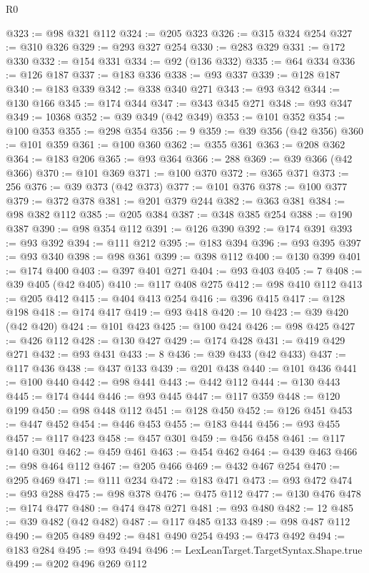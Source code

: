 \begin{lexlean}{R0}
\begin{coremodule}
@323 := @98 @321 @112
@324 := @205 @323
@326 := @315 @324 @254
@327 := @310 @326
@329 := @293 @327 @254
@330 := @283 @329
@331 := @172 @330
@332 := @154 @331
@334 := @92 (@136 @332)
@335 := @64 @334
@336 := @126 @187
@337 := @183 @336
@338 := @93 @337
@339 := @128 @187
@340 := @183 @339
@342 := @338 @340 @271
@343 := @93 @342
@344 := @130 @166
@345 := @174 @344
@347 := @343 @345 @271
@348 := @93 @347
@349 := 10368
@352 := @39 @349 (@42 @349)
@353 := @101 @352
@354 := @100 @353
@355 := @298 @354
@356 := 9
@359 := @39 @356 (@42 @356)
@360 := @101 @359
@361 := @100 @360
@362 := @355 @361
@363 := @208 @362
@364 := @183 @206
@365 := @93 @364
@366 := 288
@369 := @39 @366 (@42 @366)
@370 := @101 @369
@371 := @100 @370
@372 := @365 @371
@373 := 256
@376 := @39 @373 (@42 @373)
@377 := @101 @376
@378 := @100 @377
@379 := @372 @378
@381 := @201 @379 @244
@382 := @363 @381
@384 := @98 @382 @112
@385 := @205 @384
@387 := @348 @385 @254
@388 := @190 @387
@390 := @98 @354 @112
@391 := @126 @390
@392 := @174 @391
@393 := @93 @392
@394 := @111 @212
@395 := @183 @394
@396 := @93 @395
@397 := @93 @340
@398 := @98 @361
@399 := @398 @112
@400 := @130 @399
@401 := @174 @400
@403 := @397 @401 @271
@404 := @93 @403
@405 := 7
@408 := @39 @405 (@42 @405)
@410 := @117 @408 @275
@412 := @98 @410 @112
@413 := @205 @412
@415 := @404 @413 @254
@416 := @396 @415
@417 := @128 @198
@418 := @174 @417
@419 := @93 @418
@420 := 10
@423 := @39 @420 (@42 @420)
@424 := @101 @423
@425 := @100 @424
@426 := @98 @425
@427 := @426 @112
@428 := @130 @427
@429 := @174 @428
@431 := @419 @429 @271
@432 := @93 @431
@433 := 8
@436 := @39 @433 (@42 @433)
@437 := @117 @436
@438 := @437 @133
@439 := @201 @438
@440 := @101 @436
@441 := @100 @440
@442 := @98 @441
@443 := @442 @112
@444 := @130 @443
@445 := @174 @444
@446 := @93 @445
@447 := @117 @359
@448 := @120 @199
@450 := @98 @448 @112
@451 := @128 @450
@452 := @126 @451
@453 := @447 @452
@454 := @446 @453
@455 := @183 @444
@456 := @93 @455
@457 := @117 @423
@458 := @457 @301
@459 := @456 @458
@461 := @117 @140 @301
@462 := @459 @461
@463 := @454 @462
@464 := @439 @463
@466 := @98 @464 @112
@467 := @205 @466
@469 := @432 @467 @254
@470 := @295 @469
@471 := @111 @234
@472 := @183 @471
@473 := @93 @472
@474 := @93 @288
@475 := @98 @378
@476 := @475 @112
@477 := @130 @476
@478 := @174 @477
@480 := @474 @478 @271
@481 := @93 @480
@482 := 12
@485 := @39 @482 (@42 @482)
@487 := @117 @485 @133
@489 := @98 @487 @112
@490 := @205 @489
@492 := @481 @490 @254
@493 := @473 @492
@494 := @183 @284
@495 := @93 @494
@496 := LexLeanTarget.TargetSyntax.Shape.true
@499 := @202 @496 @269 @112

\end{coremodule}
\end{lexlean}
